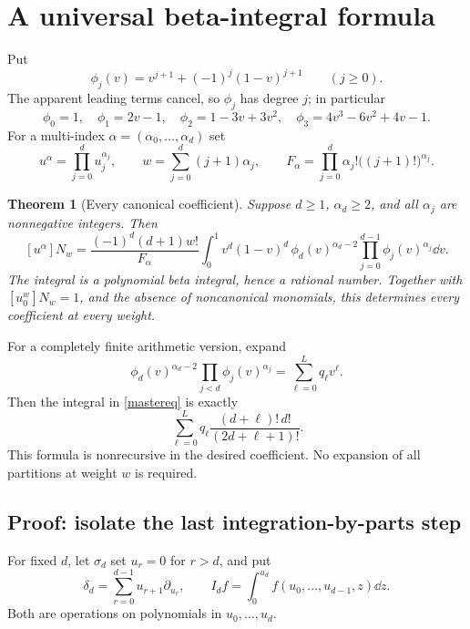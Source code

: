 \documentclass[11pt]{article}
\numberwithin{equation}{section}
\newtheorem{theorem}{Theorem}[section]
\theoremstyle{definition}\newtheorem{definition}[theorem]{Definition}
\theoremstyle{remark}\newtheorem{remark}[theorem]{Remark}
\begin{document}
\section{A universal beta-integral formula}
Put
\begin{equation}\label{phi}
 \phi_j(v)=v^{j+1}+(-1)^j(1-v)^{j+1}\qquad(j\ge0).
\end{equation}
The apparent leading terms cancel, so $\phi_j$ has degree $j$; in particular
\[
 \phi_0=1,\quad \phi_1=2v-1,\quad
 \phi_2=1-3v+3v^2,\quad
 \phi_3=4v^3-6v^2+4v-1.
\]
For a multi-index $\alpha=(\alpha_0,\ldots,\alpha_d)$ set
\[
 u^\alpha=\prod_{j=0}^d u_j^{\alpha_j},\qquad
 w=\sum_{j=0}^d(j+1)\alpha_j,\qquad
 F_\alpha=\prod_{j=0}^d\alpha_j!\bigl((j+1)!\bigr)^{\alpha_j}.
\]

\begin{theorem}[Every canonical coefficient]\label{master}
Suppose $d\ge1$, $\alpha_d\ge2$, and all $\alpha_j$ are nonnegative integers. Then
\begin{equation}\label{mastereq}
\boxed{
 [u^\alpha]N_w
 =\frac{(-1)^d(d+1)w!}{F_\alpha}
 \int_0^1 v^d(1-v)^d\,
 \phi_d(v)^{\alpha_d-2}
 \prod_{j=0}^{d-1}\phi_j(v)^{\alpha_j}\dd v .}
\end{equation}
The integral is a polynomial beta integral, hence a rational number. Together with $[u_0^w]N_w=1$, and the absence of noncanonical monomials, this determines every coefficient at every weight.
\end{theorem}

For a completely finite arithmetic version, expand
\[
 \phi_d(v)^{\alpha_d-2}\prod_{j<d}\phi_j(v)^{\alpha_j}
 =\sum_{\ell=0}^L q_\ell v^\ell.
\]
Then the integral in \eqref{mastereq} is exactly
\begin{equation}\label{finitebeta}
 \sum_{\ell=0}^L q_\ell
 \frac{(d+\ell)!\,d!}{(2d+\ell+1)!}.
\end{equation}
This formula is nonrecursive in the desired coefficient. No expansion of all partitions at weight $w$ is required.

\subsection{Proof: isolate the last integration-by-parts step}
For fixed $d$, let $\sigma_d$ set $u_r=0$ for $r>d$, and put
\[
 \delta_d=\sum_{r=0}^{d-1}u_{r+1}\partial_{u_r},\qquad
 I_df=\int_0^{u_d}f(u_0,\ldots,u_{d-1},z)\dd z.
\]
Both are operations on polynomials in $u_0,\ldots,u_d$.
\end{document}

